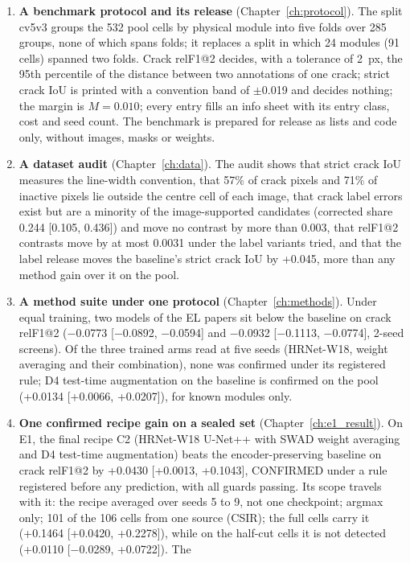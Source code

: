 \begin{enumerate}
  \item \textbf{A benchmark protocol and its release} (Chapter~\ref{ch:protocol}). The split cv5v3 groups the 532 pool cells by
  physical module into five folds over 285 groups, none of which spans folds; it replaces a split in which 24 modules (91 cells)
  spanned two folds. Crack relF1@2 decides, with a tolerance of 2~px, the 95th percentile of the distance between two annotations of one crack;
  strict crack IoU is printed with a convention band of $\pm$0.019 and decides nothing; the margin is $M=0.010$; every entry fills
  an info sheet with its entry class, cost and seed count. The benchmark is prepared for release as lists and code only, without images, masks
  or weights.
  \item \textbf{A dataset audit} (Chapter~\ref{ch:data}). The audit shows that strict crack IoU measures the line-width convention,
  that 57\% of crack pixels and 71\% of inactive pixels lie outside the centre cell of each image, that crack label errors exist but
  are a minority of the image-supported candidates (corrected share 0.244 [0.105, 0.436]) and move no contrast by more than 0.003,
  that relF1@2 contrasts move by at most 0.0031 under the label variants tried, and that the label release moves the baseline's
  strict crack IoU by +0.045, more than any method gain over it on the pool.
  \item \textbf{A method suite under one protocol} (Chapter~\ref{ch:methods}). Under equal training, two models of the EL papers sit
  below the baseline on crack relF1@2 ($-$0.0773 [$-$0.0892, $-$0.0594] and $-$0.0932 [$-$0.1113, $-$0.0774], 2-seed screens).
  Of the three trained arms read at five seeds (HRNet-W18, weight averaging and their combination), none was confirmed under its
  registered rule; D4 test-time augmentation on the baseline is confirmed on the pool (+0.0134 [+0.0066, +0.0207]), for known
  modules only.
  \item \textbf{One confirmed recipe gain on a sealed set} (Chapter~\ref{ch:e1_result}). On E1, the final recipe C2 (HRNet-W18
  U-Net++ with SWAD weight averaging and D4 test-time augmentation) beats the encoder-preserving baseline on crack relF1@2 by +0.0430
  [+0.0013, +0.1043], CONFIRMED under a rule registered before any prediction, with all guards passing. Its scope travels with it:
  the recipe averaged over seeds 5 to 9, not one checkpoint; argmax only; 101 of the 106 cells from one source (CSIR); the full
  cells carry it (+0.1464 [+0.0420, +0.2278]), while on the half-cut cells it is not detected (+0.0110 [$-$0.0289, +0.0722]). The

\end{enumerate}
